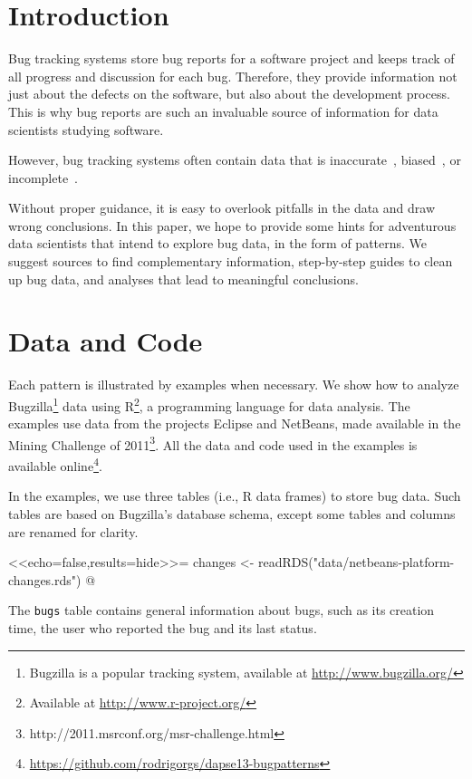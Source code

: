 \section{Introduction}

Bug tracking systems store bug reports for a software project and keeps track of all progress and discussion for each bug. Therefore, they provide information not just about the defects on the software, but also about the development process. This is why bug reports are such an invaluable source of information for data scientists studying software.

However, bug tracking systems often contain data that is inaccurate~\cite{Antoniol2008}, biased~\cite{Bird2009}, or incomplete~\cite{Aranda2009}. 

Without proper guidance, it is easy to overlook pitfalls in the data and draw wrong conclusions. In this paper, we hope to provide some hints for adventurous data scientists that intend to explore bug data, in the form of patterns. We suggest sources to find complementary information, step-by-step guides to clean up bug data, and analyses that lead to meaningful conclusions.

\section{Data and Code}

Each pattern is illustrated by examples when necessary. We show how to analyze Bugzilla\footnote{Bugzilla is a popular tracking system, available at \url{http://www.bugzilla.org/}} data using R\footnote{Available at \url{http://www.r-project.org/}}, a programming language for data analysis. The examples use data from the projects Eclipse and NetBeans, made available in the Mining Challenge of 2011\footnote{http://2011.msrconf.org/msr-challenge.html}. All the data and code used in the examples is available online\footnote{\url{https://github.com/rodrigorgs/dapse13-bugpatterns}}. 

In the examples, we use three tables (i.e., R data frames) to store bug data. Such tables are based on Bugzilla's database schema, except some tables and columns are renamed for clarity.

<<echo=false,results=hide>>=
changes <- readRDS("data/netbeans-platform-changes.rds")
@

The {\tt bugs} table contains general information about bugs, such as its creation time, the user who reported the bug and its last status.

